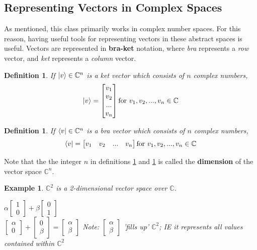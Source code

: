\documentclass[12pt]{article}
\theoremstyle{plain}
\theoremstyle{nonumberplain}
\theoremstyle{plain}
\newtheorem{definition}[lemma]{Definition}
\newtheorem{example}[lemma]{Example}
\theoremstyle{nonumberplain}
\newcommand\1{{\bf 1}}
\newcommand{\bmat}[1]{\begin{bmatrix*} #1 \end{bmatrix*}} %
\newcommand{\C}{\mathbb{C}} %
\newcommand{\<}{\left\langle}
\renewcommand{\>}{\right\rangle}
\begin{document}

\subsection{Representing Vectors in Complex Spaces}
As mentioned, this class primarily works in complex number spaces. For this reason, having useful tools for representing vectors in these abstract spaces is useful. Vectors are represented in \textbf{bra-ket} notation, where \textit{bra} represents a \textit{row} vector, and \textit{ket} represents a \textit{column} vector.

\begin{definition}\label{def:ket}
If $\ket{v}\in\C^n$ is a \textit{ket} vector which consists of $n$ complex numbers,
\begin{equation}
\ket{v}=\bmat{v_1 \\ v_2 \\ ... \\ v_n} \textrm{for } v_1, v_2, ..., v_n \in \C
\end{equation}
\end{definition}

\begin{definition}\label{def:bra}
If $\bra{v}\in\C^n$ is a \textit{bra} vector which consists of $n$ complex numbers,
\begin{equation}
\bra{v}=\bmat{v_1 & v_2 & ... & v_n} \textrm{for } v_1, v_2, ..., v_n \in \C
\end{equation}
\end{definition}
Note that the the integer $n$ in definitions \ref{def:ket} and \ref{def:bra} is called the \textbf{dimension} of the vector space $\C^n$.

\begin{example}
$\C^2$ is a 2-dimensional vector space over $\C$.
\begin{center}
$\alpha\bmat{1 \\ 0} + \beta\bmat{0 \\ 1}$ \\
$\bmat{\alpha \\ 0}+\bmat{0 \\ \beta}=\bmat{\alpha \\ \beta}$
Note: $\bmat{\alpha \\ \beta}$ 'fills up' $\C^2$; IE it represents all values contained within $\C^2$
\end{center}
\end{example}
\end{document}
